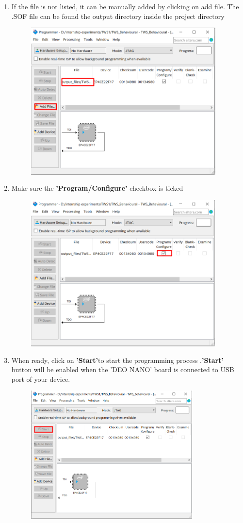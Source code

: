 \documentclass[12pt]{article}
\begin{document}
\begin{enumerate}
     \item If the file is not listed, it can be manually added by clicking on add file. The .SOF file can be found the output directory inside the project directory 
     \begin{figure}[H]
         \centering
         \includegraphics[height=8cm,keepaspectratio]{download1.png}
     \end{figure}
     \item Make sure the \textbf{'Program/Configure'} checkbox is ticked
     \begin{figure}[H]
         \centering
         \includegraphics[height=8cm,keepaspectratio]{download2.png}
     \end{figure}
     \item When ready, click on \textbf{'Start'}to start the programming process .\textbf{'Start'} button will be enabled when the 'DEO NANO' board is connected to USB port of your device. 
     \begin{figure}[H]
         \centering
         \includegraphics[height=7cm,keepaspectratio]{download3.png}

\end{figure}
\end{enumerate}
\end{document}
